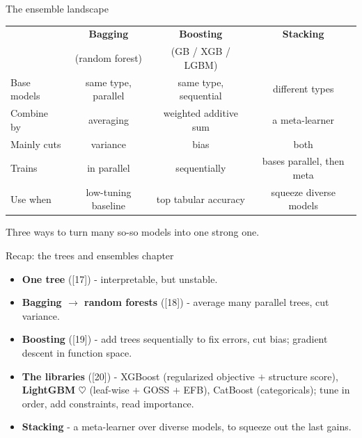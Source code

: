 \documentclass[aspectratio=169]{beamer}
\begin{document}
\begin{frame}{The ensemble landscape}
  \begin{center}\small
    \renewcommand{\arraystretch}{1.3}
    \begin{tabular}{l c c c}
      \toprule
                   & \textbf{Bagging} & \textbf{Boosting} & \textbf{Stacking} \\
                   & {\scriptsize (random forest)} & {\scriptsize (GB / XGB / LGBM)} & \\
      \midrule
      Base models  & same type, parallel & same type, sequential & different types \\
      Combine by   & averaging & weighted additive sum & a meta-learner \\
      Mainly cuts  & variance & bias & both \\
      Trains       & in parallel & sequentially & bases parallel, then meta \\
      Use when     & low-tuning baseline & top tabular accuracy & squeeze diverse models \\
      \bottomrule
    \end{tabular}
  \end{center}
  \vfill
  \footnotesize Three ways to turn many so-so models into one strong one.
\end{frame}

\begin{frame}{Recap: the trees and ensembles chapter}
  \begin{itemize}\small
    \item \textbf{One tree} ([17]) - interpretable, but unstable.
    \item \textbf{Bagging $\to$ random forests} ([18]) - average many parallel trees, cut variance.
    \item \textbf{Boosting} ([19]) - add trees sequentially to fix errors, cut bias; gradient
      descent in function space.
    \item \textbf{The libraries} ([20]) - XGBoost (regularized objective $+$ structure score),
      \textbf{LightGBM} \textcolor{armred}{$\heartsuit$} (leaf-wise $+$ GOSS $+$ EFB), CatBoost
      (categoricals); tune in order, add constraints, read importance.
    \item \textbf{Stacking} - a meta-learner over diverse models, to squeeze out the last gains.
  \end{itemize}
  \vfill
\end{frame}
\end{document}
